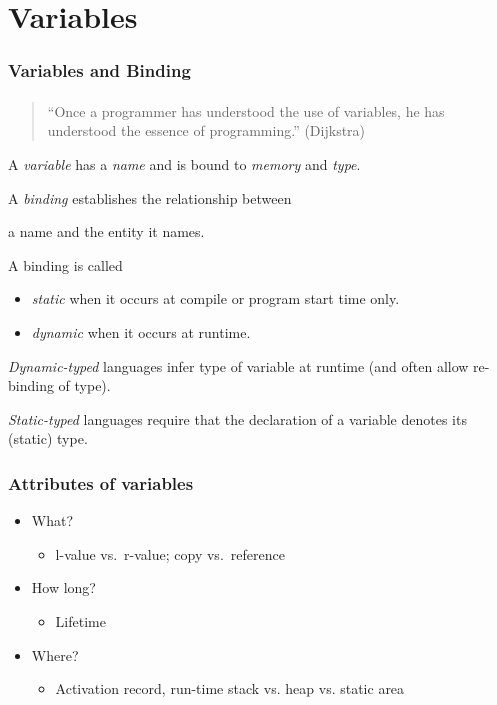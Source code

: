 \documentclass{beamer}
\begin{document}
\section{Variables}
\begin{frame}[fragile]
\frametitle{Variables and Binding}
\framesubtitle{}
\begin{quote}\small
``Once a programmer has understood the use of variables, he has
understood the essence of programming.'' (Dijkstra)
\end{quote}
\medskip

A \emph{variable} has a \emph{name} and is bound to \emph{memory} and
\emph{type}.

\begin{definition}[Binding]
  A \emph{binding} establishes the relationship between
  \begin{center} a name and the entity it names.\end{center}

  A binding is called 
  \begin{itemize}
  \item \emph{static} when it occurs at compile or program
    start time only.
  \item \emph{dynamic} when it occurs at runtime.
  \end{itemize} 
\end{definition}

\medskip
\emph{Dynamic-typed} languages infer type of variable at runtime (and
often allow re-binding of type). 
\smallskip\pause

\emph{Static-typed} languages require that the declaration of a
variable denotes its (static) type. 

\end{frame}

\begin{frame}[fragile]
\frametitle{Attributes of variables}



\begin{itemize}
\item What?
\begin{itemize}
\item l-value vs.\ r-value; copy vs.\ reference
\end{itemize}
\item How long?

\begin{itemize}
\item Lifetime 
\end{itemize}
\item Where? 
\begin{itemize}
\item Activation record, run-time stack vs. heap vs. static area
\end{itemize}
\end{itemize}

\end{frame}
\end{document}
